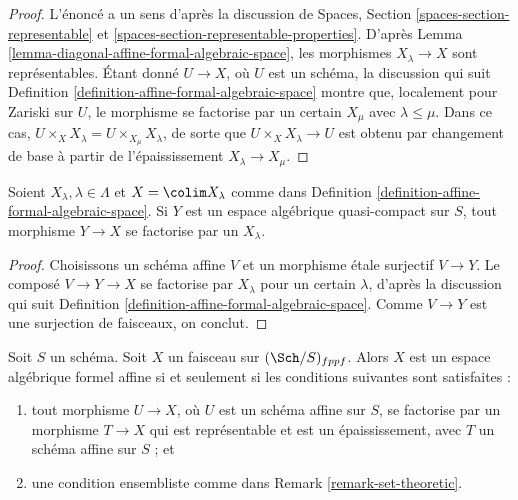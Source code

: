 \begin{proof}
L'énoncé a un sens d'après la discussion de
Spaces, Section \ref{spaces-section-representable} et
\ref{spaces-section-representable-properties}.
D'après Lemma \ref{lemma-diagonal-affine-formal-algebraic-space},
les morphismes $X_\lambda \to X$ sont représentables.
Étant donné $U \to X$, où $U$ est un schéma,
la discussion qui suit
Definition \ref{definition-affine-formal-algebraic-space}
montre que, localement pour Zariski sur $U$, le
morphisme se factorise par un certain $X_\mu$ avec $\lambda \leq \mu$.
Dans ce cas, $U \times_X X_\lambda = U \times_{X_\mu} X_\lambda$,
de sorte que $U \times_X X_\lambda \to U$ est obtenu par changement de base à partir de
l'épaississement $X_\lambda \to X_\mu$.
\end{proof}

\begin{lemma}
\label{lemma-factor-through-thickening}
Soient $X_\lambda, \lambda \in \Lambda$ et $X = \colim X_\lambda$
comme dans Definition \ref{definition-affine-formal-algebraic-space}.
Si $Y$ est un espace algébrique quasi-compact sur $S$, tout
morphisme $Y \to X$ se factorise par un $X_\lambda$.
\end{lemma}

\begin{proof}
Choisissons un schéma affine $V$ et un morphisme étale surjectif
$V \to Y$. Le composé $V \to Y \to X$ se factorise par
$X_\lambda$ pour un certain $\lambda$, d'après la discussion qui suit
Definition \ref{definition-affine-formal-algebraic-space}.
Comme $V \to Y$ est une surjection de faisceaux, on conclut.
\end{proof}

\begin{lemma}
\label{lemma-characterize-affine-formal-algebraic-space}
Soit $S$ un schéma. Soit $X$ un faisceau sur $(\Sch/S)_{fppf}$.
Alors $X$ est un espace algébrique formel affine si et seulement si
les conditions suivantes sont satisfaites :
\begin{enumerate}
\item tout morphisme $U \to X$, où $U$ est un schéma affine sur $S$,
se factorise par un morphisme $T \to X$ qui est représentable et est un
épaississement, avec $T$ un schéma affine sur $S$ ; et
\item une condition ensembliste comme dans Remark \ref{remark-set-theoretic}.
\end{enumerate}
\end{lemma}

